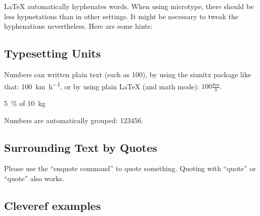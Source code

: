 \documentclass[ngerman,runningheads,a4paper]{llncs}[2018/03/10]
\begin{document}
\LaTeX{} automatically hyphenates words.
When using microtype, there should be less hypnetations than in other settings.
It might be necessary to tweak the hyphenations nevertheless.
Here are some hints:


\subsection{Typesetting Units}

\begin{ltgexample}
Numbers can written plain text (such as 100), by using the siunitx package like that:
\SI{100}{\km\per\hour},
or by using plain \LaTeX{} (and math mode):
$100 \frac{\mathit{km}}{h}$.
\end{ltgexample}

\begin{ltgexample}
\SI{5}{\percent} of \SI{10}{kg}
\end{ltgexample}

\begin{ltgexample}
Numbers are automatically grouped: \num{123456}.
\end{ltgexample}

\subsection{Surrounding Text by Quotes}

\begin{ltgexample}
Please use the \enquote{enquote command} to quote something.
Quoting with "`quote"' or ``quote'' also works.

\end{ltgexample}
\subsection{Cleveref examples}
\label{sec:ex:cref}
\end{document}
